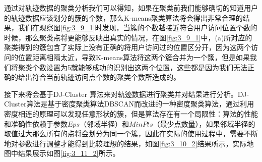 \par 通过对轨迹数据的聚类分析我们可以得知，如果在聚类前我们能够确切的知道用户的轨迹数据应该划分的簇的个数，那么K-means聚类算法将会得出非常合理的结果，我们在观察图\ref{fig:3_9_1}时发现，当簇的个数越接近符合用户访问位置个数的时候，那么聚类点将更能够反映出真实的情况，在图\ref{fig:3_9_1}中，(a)所对应的聚类得到的簇包含了实际上没有正确的将用户访问过的位置区分开，因为这两个访问的位置距离相隔太近，导致K-means算法将这两个簇合并为一个簇，但是如果我们将聚类个数设置为5就能够成功的识别出这两个位置，这些都是因为我们无法正确的给出符合当前轨迹访问点个数的聚类个数所造成的。
\par 接下来将会基于DJ-Cluster 算法来对轨迹数据进行聚类并对结果进行分析。DJ-Cluster算法是基于密度聚类算法DBSCAN而改进的一种密度聚类算法，通过利用密度相连的原理可以发现任意形状的簇，但是算法存在有一个局限性：算法的性能和准确性依赖于参数$Eps$（邻域半径）和$MinPts$（最少点数量），如果邻域半径的取值过大那么所有的点将会划分为同一个簇，因此在实际的使用过程中，需要不断地对参数进行调整才能得到比较理想的结果，如图\ref{fig:3_10_2}结果所示，实际地图中结果展示如图\ref{fig:3_11_2}所示。

